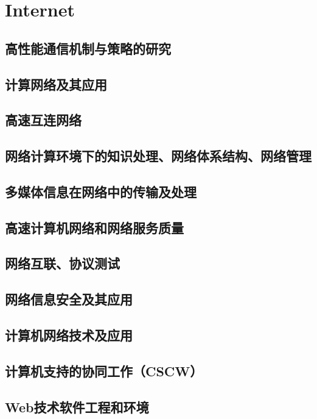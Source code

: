 

\chapter{Internet}

\section{高性能通信机制与策略的研究}
\section{计算网络及其应用}
\section{高速互连网络}
\section{网络计算环境下的知识处理、网络体系结构、网络管理}
\section{多媒体信息在网络中的传输及处理}
\section{高速计算机网络和网络服务质量}
\section{网络互联、协议测试}
\section{网络信息安全及其应用}
\section{计算机网络技术及应用}
\section{计算机支持的协同工作（CSCW）}
\section{Web技术软件工程和环境}
